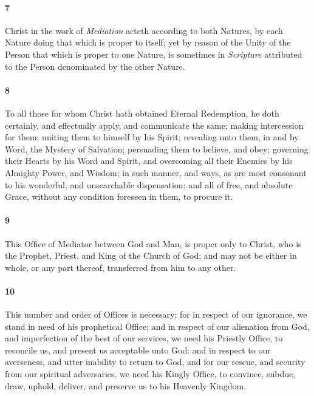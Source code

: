 \documentclass[
    paper=letterpaper,
    11pt,
    twoside,
    DIV=calc,
    openany
]{scrbook}
\newcommand{\oldgrammar}[2]{#2}
\begin{document}
\footnotebegin
{}
\footnoteend
\pagebreak
\paragraph{7} %
Christ in the work of \textit{Mediation} acteth according to both Natures, by each Nature doing that which is proper to itself; yet by reason of the Unity of the Person that which is proper to one Nature, is sometimes in \textit{Scripture} attributed to the Person \R{}denominated by the other Nature.

\footnotebegin
{}
\footnoteend

\paragraph{8} %
To all those for whom Christ hath obtained Eternal Redemption, he doth certainly, and effectually \R{}apply, and communicate the same; making intercession for them; uniting them to himself by his Spirit; \R{}revealing unto them, in and by Word, the Mystery of Salvation; persuading them to believe, and obey; \R{}governing their Hearts by his Word and Spirit, and \R{}overcoming all their Enemies by his Almighty Power, and Wisdom; in such manner, and ways, as are most consonant to his wonderful, and \R{}unsearchable dispensation; and all of free, and absolute Grace, without any condition foreseen in them, to procure it.

\footnotebegin
{}
\footnoteend

\paragraph{9} %
This Office of Mediator between God and Man, is proper \R{}only to Christ, who is the Prophet, Priest, and King of the Church of God; and may not be either in whole, or any part thereof, \oldgrammar{transferr'd}{transferred} from him to any other.

\footnotebegin
{}
\footnoteend

\paragraph{10} %
This number and order of Offices is necessary; for in respect of our \R{}ignorance, we stand in need of his prophetical Office; and in respect of our alienation from God, \R{}and imperfection of the best of our services, we need his Priestly Office, to reconcile us, and present us acceptable unto God: and in respect to our averseness, and utter inability to return to God, and for our rescue, and security from our spiritual adversaries, we need his Kingly Office, \R{}to convince, subdue, draw, uphold, deliver, and preserve us to his Heavenly Kingdom.
\end{document}
